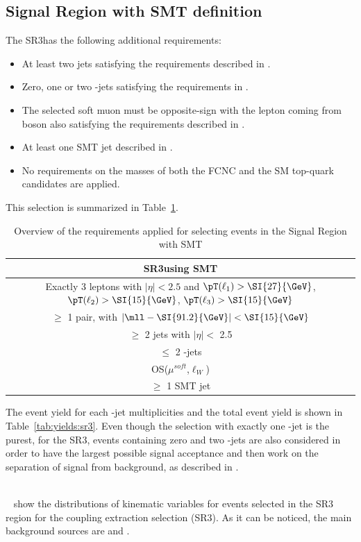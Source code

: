 \clearpage
\subsection {Signal Region with SMT definition}
\label{sec:sel:sr3}
The SR3\tZc has the following additional requirements:
\begin{itemize}
	\item At least two jets satisfying the requirements described in . 
	\item Zero, one or two \Pqb-jets satisfying the requirements in . 
	\item The selected soft muon must be opposite-sign with the lepton coming from \PW boson also satisfying the requirements described in  .
	\item At least one SMT jet described in . 
	\item No requirements on the masses of both the FCNC and the SM top-quark candidates are applied. 
\end{itemize}
This selection is summarized in Table~\ref{tab:sel:sr3_smt}.
\begin{table}[!h]
	\centering
	\small
	\begin{tabular}{c}
		\toprule
		SR3\tZc using SMT\\
		\midrule
		Exactly 3 leptons with $|\eta| < 2.5$ and $\pT(\ell_1)> \SI{27}{\GeV}$, $\pT(\ell_2)> \SI{15}{\GeV}$, $\pT(\ell_3)> \SI{15}{\GeV}$\\
		$\ge$ 1 \OSSF pair, with $|\mll - \SI{91.2}{\GeV}| < \SI{15}{\GeV}$\\
		$\ge$ 2 jets with $|\eta| < $ 2.5\\
		$\le$ 2 \Pqb-jets\\
		OS($\mu^{soft}$,$\ell_W$)\\
		$\ge$ 1 SMT jet \\
		\bottomrule
	\end{tabular}
\caption{Overview of the requirements applied for selecting events in the Signal Region with SMT}
\label{tab:sel:sr3_smt}
\end{table}    
		
\noindent The event yield for each \Pqb-jet multiplicities and the total event yield is shown in Table~\ref{tab:yields:sr3}. 
Even though the selection with exactly one \Pqb-jet is the purest, for the SR3\tZc, events containing zero and two \Pqb-jets are also considered in order to have the largest possible signal acceptance and then work on the separation of signal from background, as described in .
\begin{table}[!h]
	\centering
	\footnotesize
	
	\caption{Event yield for each \Pqb-jet multiplicities and total event yield for the SR3\tZc selection.}
	\label{tab:yields:sr3}
\end{table}    
\\~ show the distributions of kinematic variables for events selected in the SR3 region for the \tZc coupling extraction selection (SR3\tZc).
As it can be noticed, the main background sources are \ttZ and \VVHF.

